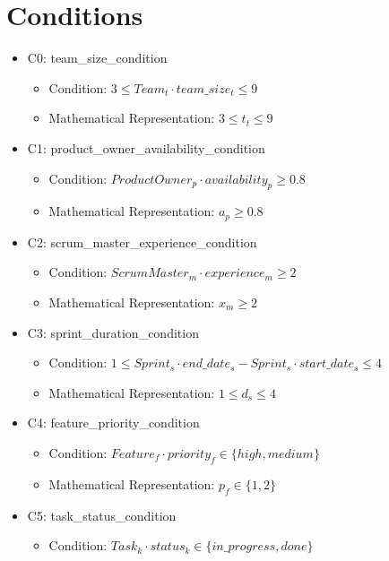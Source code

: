 \documentclass{article}
\begin{document}
\section{Conditions}
\begin{itemize}
    \item C0: team\_size\_condition
        \begin{itemize}
            \item Condition: $3 \leq Team_{t} \cdot team\_size_{t} \leq 9$
            \item Mathematical Representation: $3 \leq t_{t} \leq 9$
        \end{itemize}
    \item C1: product\_owner\_availability\_condition
        \begin{itemize}
            \item Condition: $ProductOwner_{p} \cdot availability_{p} \geq 0.8$
            \item Mathematical Representation: $a_{p} \geq 0.8$
        \end{itemize}
    \item C2: scrum\_master\_experience\_condition
        \begin{itemize}
            \item Condition: $ScrumMaster_{m} \cdot experience_{m} \geq 2$
            \item Mathematical Representation: $x_{m} \geq 2$
        \end{itemize}
    \item C3: sprint\_duration\_condition
        \begin{itemize}
            \item Condition: $1 \leq Sprint_{s} \cdot end\_date_{s} - Sprint_{s} \cdot start\_date_{s} \leq 4$
            \item Mathematical Representation: $1 \leq d_{s} \leq 4$
        \end{itemize}
    \item C4: feature\_priority\_condition
        \begin{itemize}
            \item Condition: $Feature_{f} \cdot priority_{f} \in \{high, medium\}$
            \item Mathematical Representation: $p_{f} \in \{1, 2\}$
        \end{itemize}
    \item C5: task\_status\_condition
        \begin{itemize}
            \item Condition: $Task_{k} \cdot status_{k} \in \{in\_progress, done\}$

\end{itemize}
\end{itemize}
\end{document}
